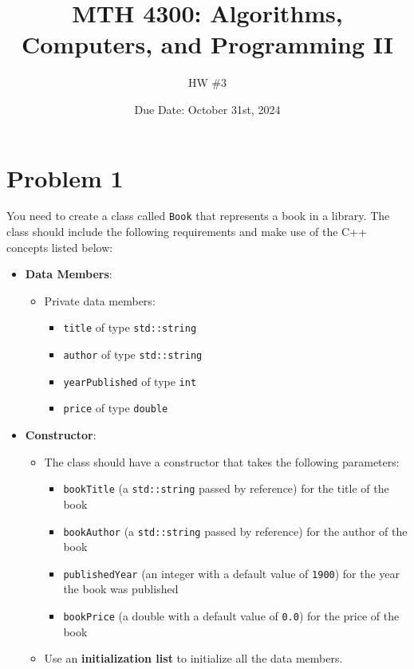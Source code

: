 \documentclass[a4paper]{article}
\title{MTH 4300: Algorithms, Computers, and Programming II}
\author{HW \#3}
\date{Due Date: October 31st, 2024}
\begin{document}
\maketitle


\section*{Problem 1}
You need to create a class called \texttt{Book} that represents a book in a library. The class should include the following requirements and make use of the C++ concepts listed below:

\begin{itemize}
    \item \textbf{Data Members}:
    \begin{itemize}
        \item Private data members:
        \begin{itemize}
            \item \texttt{title} of type \texttt{std::string}
            \item \texttt{author} of type \texttt{std::string}
            \item \texttt{yearPublished} of type \texttt{int}
            \item \texttt{price} of type \texttt{double}
        \end{itemize}
    \end{itemize}

    \item \textbf{Constructor}:
    \begin{itemize}
        \item The class should have a constructor that takes the following parameters:
        \begin{itemize}
            \item \texttt{bookTitle} (a \texttt{std::string} passed by reference) for the title of the book
            \item \texttt{bookAuthor} (a \texttt{std::string} passed by reference) for the author of the book
            \item \texttt{publishedYear} (an integer with a default value of \texttt{1900}) for the year the book was published
            \item \texttt{bookPrice} (a double with a default value of \texttt{0.0}) for the price of the book
        \end{itemize}
        \item Use an \textbf{initialization list} to initialize all the data members.
    \end{itemize}


\end{itemize}
\end{document}
